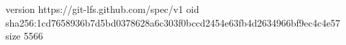 version https://git-lfs.github.com/spec/v1
oid sha256:1cd7658936b7d5bd0378628a6c303f0bccd2454e63fb4d2634966bf9ec4c4e57
size 5566
